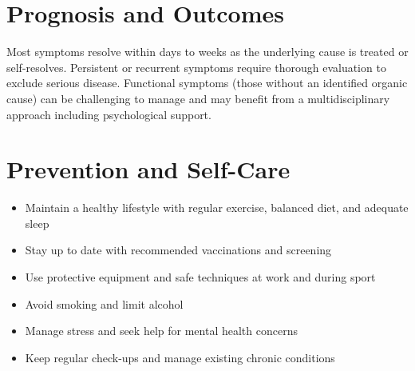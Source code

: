 \section*{Prognosis and Outcomes}
Most symptoms resolve within days to weeks as the underlying cause is treated or self-resolves. Persistent or recurrent symptoms require thorough evaluation to exclude serious disease. Functional symptoms (those without an identified organic cause) can be challenging to manage and may benefit from a multidisciplinary approach including psychological support.

\section*{Prevention and Self-Care}
\begin{itemize}
    \item Maintain a healthy lifestyle with regular exercise, balanced diet, and adequate sleep
    \item Stay up to date with recommended vaccinations and screening
    \item Use protective equipment and safe techniques at work and during sport
    \item Avoid smoking and limit alcohol
    \item Manage stress and seek help for mental health concerns
    \item Keep regular check-ups and manage existing chronic conditions
\end{itemize}
